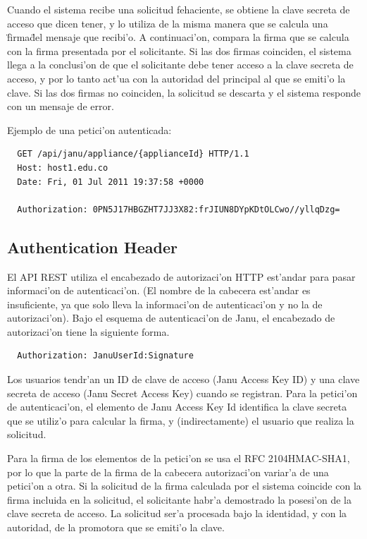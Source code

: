 Cuando el sistema recibe una solicitud fehaciente, se obtiene la clave secreta de acceso que dicen tener, y lo utiliza de la misma manera que se calcula una \"firma\" del mensaje que recibi'o. A continuaci'on, compara la firma que se calcula con la firma presentada por el solicitante. Si las dos firmas coinciden, el sistema llega a la conclusi'on de que el solicitante debe tener acceso a la clave secreta de acceso, y por lo tanto act'ua con la autoridad del principal al que se emiti'o la clave. Si las dos firmas no coinciden, la solicitud se descarta y el sistema responde con un mensaje de error.

Ejemplo de una petici'on autenticada:

\medskip
\begin{lstlisting}
  GET /api/janu/appliance/{applianceId} HTTP/1.1
  Host: host1.edu.co
  Date: Fri, 01 Jul 2011 19:37:58 +0000

  Authorization: 0PN5J17HBGZHT7JJ3X82:frJIUN8DYpKDtOLCwo//yllqDzg= 
\end{lstlisting}

\subsection{Authentication Header}

El API REST utiliza el encabezado de autorizaci'on HTTP est'andar para pasar informaci'on de autenticaci'on. (El nombre de la cabecera est'andar es insuficiente, ya que solo lleva la informaci'on de autenticaci'on y no la de autorizaci'on). Bajo el esquema de autenticaci'on de Janu, el encabezado de autorizaci'on tiene la siguiente forma.

\medskip
\begin{lstlisting}
  Authorization: JanuUserId:Signature
\end{lstlisting}

Los usuarios tendr'an un ID de clave de acceso (Janu Access Key ID) y una clave secreta de acceso (Janu Secret Access Key) cuando se registran. Para la petici'on de autenticaci'on, el elemento de Janu Access Key Id identifica la clave secreta que se utiliz'o para calcular la firma, y (indirectamente) el usuario que realiza la solicitud.

Para la firma de los elementos de la petici'on se usa el RFC 2104HMAC-SHA1, por lo que la parte de la firma de la cabecera autorizaci'on variar'a de una petici'on a otra. Si la solicitud de la firma calculada por el sistema coincide con la firma incluida en la solicitud, el solicitante habr'a demostrado la posesi'on de la clave secreta de acceso. La solicitud ser'a procesada bajo la identidad, y con la autoridad, de la promotora que se emiti'o la clave.

